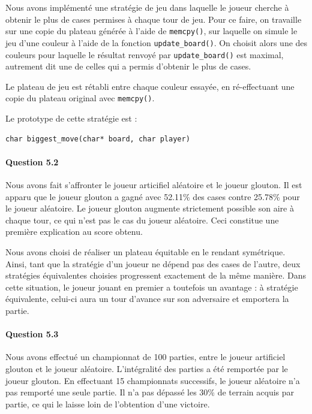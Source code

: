 \documentclass[a4paper]{article}
\begin{document}
    Nous avons implémenté une stratégie de jeu dans laquelle le joueur cherche 
à obtenir le plus de cases permises à chaque tour de jeu. Pour ce faire, on 
travaille sur une copie du plateau générée à l'aide de \texttt{memcpy()}, sur 
laquelle on simule le jeu d'une couleur à l'aide de la fonction 
\texttt{update\_board()}. On choisit alors une des couleurs pour laquelle le 
résultat renvoyé par \texttt{update\_board()} est maximal, autrement dit une de 
celles qui a permis d'obtenir le plus de cases.

Le plateau de jeu est rétabli entre chaque couleur essayée, en ré-effectuant 
une copie du plateau original avec \texttt{memcpy()}.

Le prototype de cette stratégie est : 
\begin{lstlisting}
char biggest_move(char* board, char player)
\end{lstlisting}

    \paragraph{Question 5.2}
    Nous avons fait s'affronter le joueur articifiel aléatoire et le joueur 
glouton. Il est apparu que le joueur glouton a gagné avec 52.11\% des cases 
contre 25.78\% pour le joueur aléatoire. Le joueur glouton augmente strictement 
possible son aire à chaque tour, ce qui n'est pas le cas du joueur aléatoire. 
Ceci constitue une première explication au score obtenu.

Nous avons choisi de réaliser un plateau équitable en le rendant symétrique. 
Ainsi, tant que la stratégie d'un joueur ne dépend pas des cases de l'autre, 
deux stratégies équivalentes choisies progressent exactement de la même 
manière. Dans cette situation, le joueur jouant en premier a toutefois un 
avantage : à stratégie équivalente, celui-ci aura un tour d'avance sur son 
adversaire et emportera la partie.
    \paragraph{Question 5.3}
    Nous avons effectué un championnat de 100 parties, entre le joueur 
artificiel glouton et le joueur aléatoire. L'intégralité des parties a été 
remportée par le joueur glouton. En effectuant 15 championnats successifs, le 
joueur aléatoire n'a pas remporté une seule partie. Il n'a pas dépassé les 30\% 
de terrain acquis par partie, ce qui le laisse loin de l'obtention d'une 
victoire.
\end{document}
